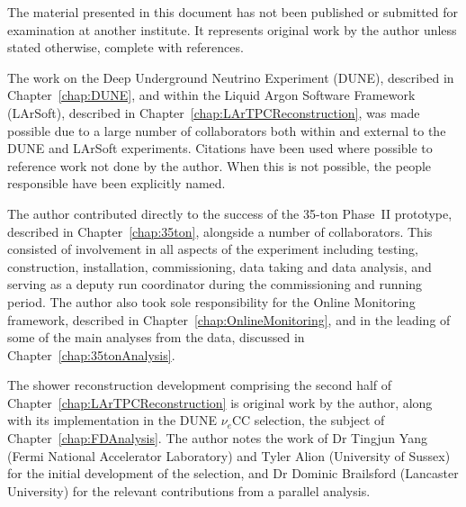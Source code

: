 
\begin{declaration}

  The material presented in this document has not been published or submitted for examination at another institute.  It represents original work by the author unless stated otherwise, complete with references.

  The work on the Deep Underground Neutrino Experiment (DUNE), described in Chapter~\ref{chap:DUNE}, and within the Liquid Argon Software Framework (LArSoft), described in Chapter~\ref{chap:LArTPCReconstruction}, was made possible due to a large number of collaborators both within and external to the DUNE and LArSoft experiments.  Citations have been used where possible to reference work not done by the author.  When this is not possible, the people responsible have been explicitly named.

  The author contributed directly to the success of the 35-ton Phase~II prototype, described in Chapter~\ref{chap:35ton}, alongside a number of collaborators.  This consisted of involvement in all aspects of the experiment including testing, construction, installation, commissioning, data taking and data analysis, and serving as a deputy run coordinator during the commissioning and running period.  The author also took sole responsibility for the Online Monitoring framework, described in Chapter~\ref{chap:OnlineMonitoring}, and in the leading of some of the main analyses from the data, discussed in Chapter~\ref{chap:35tonAnalysis}.

  The shower reconstruction development comprising the second half of Chapter~\ref{chap:LArTPCReconstruction} is original work by the author, along with its implementation in the DUNE $\nu_e$CC selection, the subject of Chapter~\ref{chap:FDAnalysis}.  The author notes the work of Dr Tingjun Yang (Fermi National Accelerator Laboratory) and Tyler Alion (University of Sussex) for the initial development of the selection, and Dr Dominic Brailsford (Lancaster University) for the relevant contributions from a parallel analysis.



\end{declaration}

